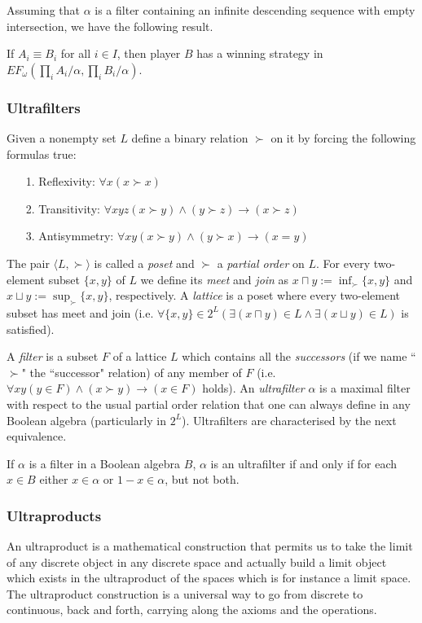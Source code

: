  
 Assuming that $\alpha$ is a filter containing an infinite descending sequence with empty intersection, we have the following result.
\begin{thm*}
If $A_i \equiv B_i$ for all $i\in I$, then player $B$ has a winning strategy in $EF_{\omega} (\prod_{i} A_i/\alpha, \prod_{i} B_i/\alpha)$.
\end{thm*}

\subsubsection*{Ultrafilters}
Given a nonempty set $L$ define a binary relation $\succ$ on it by forcing the following formulas true:
\begin{itemize} 
\item[1.] Reflexivity: $\forall x (x\succ x)$
\item[2.] Transitivity: $\forall xyz (x\succ y)\land (y\succ z)\rightarrow (x\succ z)$
\item[3.] Antisymmetry: $\forall xy (x\succ y)\land (y\succ x)\rightarrow (x=y)$ 
\end{itemize}
The pair $\langle L, \succ \rangle$ is called a \emph{poset} and $\succ$ a \emph{partial order} on $L$. For every two-element subset $\{x,y\}$ of $L$ we define its \emph{meet} and \emph{join} as $x\sqcap y := \inf_{\succ}\{x,y\}$ and $x\sqcup y := \sup_{\succ}\{x,y\}$, respectively. A \emph{lattice} is a poset where every two-element subset has meet and join (i.e. $\forall\{x,y\}\in 2^L(\exists (x\sqcap y)\in L\land\exists (x\sqcup y)\in L)$ is satisfied).

A \emph{filter} is a subset $F$ of a lattice $L$ which contains all the \emph{successors} (if we name ``$\succ$" the ``successor" relation) of any member of $F$ (i.e. $\forall xy(y\in F)\land(x\succ y)\rightarrow(x\in F)$ holds). An \emph{ultrafilter} $\alpha$ is a maximal filter with respect to the usual partial order relation that one can always define in any Boolean algebra (particularly in $2^L$). Ultrafilters are characterised by the next equivalence.

\begin{lem*}
If $\alpha$ is a filter in a Boolean algebra $B$, $\alpha$ is an ultrafilter if and only if for each $x\in B$ either $x\in\alpha$ or $1-x\in \alpha$, but not both.
\end{lem*}

\subsubsection*{Ultraproducts}
An ultraproduct is a mathematical construction that permits us to take the limit of any discrete object in any discrete space and actually build a limit object which exists in the ultraproduct of the spaces which is for instance a limit space. The ultraproduct construction is a universal way to go from discrete to continuous, back and forth, carrying along the axioms and the operations.

